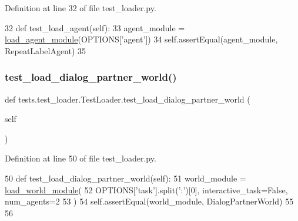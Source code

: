 Definition at line 32 of file test\+\_\+loader.\+py.


\begin{DoxyCode}
32     \textcolor{keyword}{def }test\_load\_agent(self):
33         agent\_module = \hyperlink{namespaceparlai_1_1core_1_1loader_a8e6a8f524cba24b80e9bd157c2e0ab8b}{load\_agent\_module}(OPTIONS[\textcolor{stringliteral}{'agent'}])
34         self.assertEqual(agent\_module, RepeatLabelAgent)
35 
\end{DoxyCode}
\mbox{\label{classtests_1_1test__loader_1_1TestLoader_a5fa14132e0803df0dd9237b3398f876a}} 
\subsubsection{\texorpdfstring{test\+\_\+load\+\_\+dialog\+\_\+partner\+\_\+world()}{test\_load\_dialog\_partner\_world()}}
{\footnotesize\ttfamily def tests.\+test\+\_\+loader.\+Test\+Loader.\+test\+\_\+load\+\_\+dialog\+\_\+partner\+\_\+world (\begin{DoxyParamCaption}\item[{}]{self }\end{DoxyParamCaption})}



Definition at line 50 of file test\+\_\+loader.\+py.


\begin{DoxyCode}
50     \textcolor{keyword}{def }test\_load\_dialog\_partner\_world(self):
51         world\_module = \hyperlink{namespaceparlai_1_1core_1_1loader_adb9c272f49c31c45dcbc61d8e8c6316d}{load\_world\_module}(
52             OPTIONS[\textcolor{stringliteral}{'task'}].split(\textcolor{stringliteral}{':'})[0], interactive\_task=\textcolor{keyword}{False}, num\_agents=2
53         )
54         self.assertEqual(world\_module, DialogPartnerWorld)
55 
56 
\end{DoxyCode}
\mbox{\label{classtests_1_1test__loader_1_1TestLoader_a723d2148afd57eaa33324a658600872f}} 
